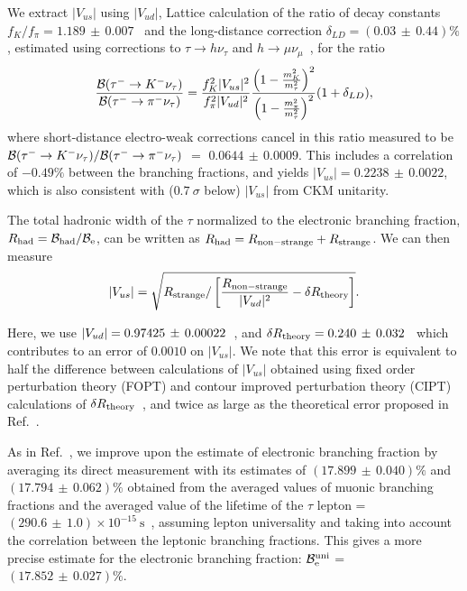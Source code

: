 \documentclass[fleqn,twoside]{article}
\def\Vus  {\ensuremath{|V_{us}|}\xspace}
\def\Vud  {\ensuremath{|V_{ud}|}\xspace}
\def\mtau       {\ensuremath{\tau}\xspace}
\begin{document}
We extract $\Vus$ using $\Vud$, Lattice calculation of the ratio of decay constants
$f_K/f_\pi = 1.189\, \pm\, 0.007$~\cite{Follana:2007uv} and
the long-distance correction $\delta_{LD} = (0.03\, \pm\, 0.44)\%$,  
estimated using corrections to $\tau\to h\nu_\tau$ and $h \to \mu\nu_\mu$~\cite{LongDistance},
for the ratio
$$\frac{{\cal{B}}({\tau^- \to K^-\nu_\tau})}{{\cal{B}}({\tau^- \to \pi^-\nu_\tau})} 
=
\frac{f_K^2 |V_{us}|^2}{f_\pi^2 |V_{ud}|^2}
 \frac{\left( 1 -  \frac{m_K^2}{m_\tau^2} \right)^2}{\left( 1 -  \frac{m_\pi^2}{m_\tau^2} \right)^2} (1+\delta_{LD}),$$
where short-distance electro-weak corrections cancel in this ratio
measured to be
${{\cal{B}}({\tau^- \to K^-\nu_\tau})}/{{\cal{B}}({\tau^- \to \pi^-\nu_\tau})}$
$=$ $ 0.0644\, \pm\, 0.0009$.
This includes a correlation of $-0.49\%$
between the branching fractions, and yields $\Vus = 0.2238\, \pm\, 0.0022$,
which is also consistent with ($0.7~\sigma$ below) $\Vus$ from CKM unitarity.
 
The total hadronic width of the \mtau normalized to the electronic branching fraction,
$R_{\rm{had}} = {\cal{B}}_{\rm{had}}/{\cal{B}}_{\rm{e}}$,
can be written as $R_{\rm{had}} = R_{\rm{non-strange}} + R_{\rm{strange}}$.
We can then measure
$$|V_{us}| = \sqrt{R_{\rm{strange}}/\left[\frac{R_{\rm{non-strange}}}{|V_{ud}|^2} -  \delta R_{\rm{theory}}\right]}.$$


Here, we use $\Vud = \Vudvalue$~\cite{Hardy:2008gy}, and $\delta R_{\rm{theory}} = 0.240\, \pm\, 0.032$~\cite{Gamiz:2006xx} 
which contributes to an error of $0.0010$ on $|V_{us}|$.
We note that this error is equivalent to  half the difference between calculations of $|V_{us}|$ 
obtained using fixed order perturbation theory (FOPT) and 
contour improved perturbation theory (CIPT) calculations of $\delta R_{\rm{theory}}$~\cite{Maltman:2010hb}, 
and twice as large as the theoretical error proposed in Ref.~\cite{Gamiz:2007qs}.

As in Ref.~\cite{Davier:2005xq}, we improve upon the estimate of
electronic branching fraction by averaging its direct measurement 
with its estimates of $(17.899\, \pm\, 0.040)\%$ and $(17.794\, \pm\, 0.062)\%$
obtained from the averaged values of muonic branching fractions and 
the averaged value of the lifetime of the 
\mtau lepton = $(290.6\, \pm\, 1.0) \times 10^{-15} ~\mathrm{s}$~\cite{PDG_2010},
assuming lepton universality and taking into account the correlation between the leptonic branching fractions.
This gives a more precise estimate for the electronic branching fraction: ${\cal{B}}^{\rm{uni}}_{\rm{e}}$ = $ (17.852\, \pm\, 0.027)\%$.
\end{document}
